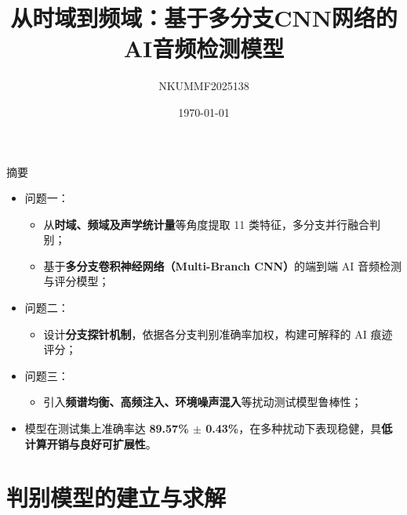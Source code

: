 \documentclass[aspectratio=169]{beamer}
\title{从时域到频域：基于多分支CNN网络的AI音频检测模型}
\author{NKUMMF2025138}
\date{\today}
\begin{document}
\begin{frame}
  \titlepage
\end{frame}


\begin{frame}{摘要}
\small
\begin{itemize}
  \item 问题一：
    \begin{itemize}
      \item 从\textbf{时域、频域及声学统计量}等角度提取 11 类特征，多分支并行融合判别；
      \item 基于\textbf{多分支卷积神经网络（Multi-Branch CNN）}的端到端 AI 音频检测与评分模型；
    \end{itemize}

  \item 问题二：
    \begin{itemize}
      \item 设计\textbf{分支探针机制}，依据各分支判别准确率加权，构建可解释的 AI 痕迹评分；
    \end{itemize}

  \item 问题三：
    \begin{itemize}
      \item 引入\textbf{频谱均衡、高频注入、环境噪声混入}等扰动测试模型鲁棒性；
    \end{itemize}
  \vspace{0.8cm}
  \item 模型在测试集上准确率达 \textbf{89.57\% $\pm$ 0.43\%}，在多种扰动下表现稳健，具\textbf{低计算开销与良好可扩展性}。
\end{itemize}
\end{frame}


\section{判别模型的建立与求解}
\end{document}
